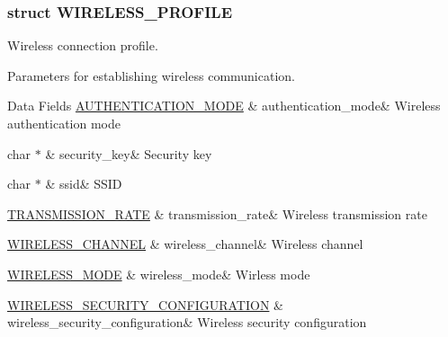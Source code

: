 \subsubsection{struct W\+I\+R\+E\+L\+E\+S\+S\+\_\+\+P\+R\+O\+F\+I\+LE}
Wireless connection profile. 

Parameters for establishing wireless communication. \begin{DoxyFields}{Data Fields}
\hyperlink{group__wireless__interface_gab857a286e4eb7fe1039f12ab48d4a3be}{A\+U\+T\+H\+E\+N\+T\+I\+C\+A\+T\+I\+O\+N\+\_\+\+M\+O\+DE}\hypertarget{group__wireless__interface_a6650b50188ef2f69d7c70876c4743812}{}\label{group__wireless__interface_a6650b50188ef2f69d7c70876c4743812}
&
authentication\+\_\+mode&
Wireless authentication mode \\
\hline

char $\ast$\hypertarget{group__wireless__interface_aff9b1c40d15a667f7e7ef07229ca648d}{}\label{group__wireless__interface_aff9b1c40d15a667f7e7ef07229ca648d}
&
security\+\_\+key&
Security key \\
\hline

char $\ast$\hypertarget{group__wireless__interface_a7436e8f0d3b781e208c633bdc0ec6829}{}\label{group__wireless__interface_a7436e8f0d3b781e208c633bdc0ec6829}
&
ssid&
S\+S\+ID \\
\hline

\hyperlink{group__wireless__interface_ga5fe34de02ca1d34a33910a3c1cadab18}{T\+R\+A\+N\+S\+M\+I\+S\+S\+I\+O\+N\+\_\+\+R\+A\+TE}\hypertarget{group__wireless__interface_a2f7408ad974b47f6ac930f3022d881cd}{}\label{group__wireless__interface_a2f7408ad974b47f6ac930f3022d881cd}
&
transmission\+\_\+rate&
Wireless transmission rate \\
\hline

\hyperlink{group__wireless__interface_ga5d523cadfff48b2f9feb3e16491ce04f}{W\+I\+R\+E\+L\+E\+S\+S\+\_\+\+C\+H\+A\+N\+N\+EL}\hypertarget{group__wireless__interface_af9924aae9c7f65ca738c86f3b9f31ddc}{}\label{group__wireless__interface_af9924aae9c7f65ca738c86f3b9f31ddc}
&
wireless\+\_\+channel&
Wireless channel \\
\hline

\hyperlink{group__wireless__interface_gaf3e0c98d38c9b4b8b78f40523ae08711}{W\+I\+R\+E\+L\+E\+S\+S\+\_\+\+M\+O\+DE}\hypertarget{group__wireless__interface_a500bb4489bd132efd620fd853fbd60ec}{}\label{group__wireless__interface_a500bb4489bd132efd620fd853fbd60ec}
&
wireless\+\_\+mode&
Wirless mode \\
\hline

\hyperlink{group__wireless__interface_gab937e212876c914a187986c349918053}{W\+I\+R\+E\+L\+E\+S\+S\+\_\+\+S\+E\+C\+U\+R\+I\+T\+Y\+\_\+\+C\+O\+N\+F\+I\+G\+U\+R\+A\+T\+I\+ON}\hypertarget{group__wireless__interface_a05905ca6e5ed6a86aaf785e11e9cc63f}{}\label{group__wireless__interface_a05905ca6e5ed6a86aaf785e11e9cc63f}
&
wireless\+\_\+security\+\_\+configuration&
Wireless security configuration \\
\hline

\end{DoxyFields}
\label{struct_n_e_t_w_o_r_k___p_r_o_f_i_l_e}
\hypertarget{group__wireless__interface_struct_n_e_t_w_o_r_k___p_r_o_f_i_l_e}{}
